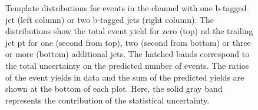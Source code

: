 \begin{figure}[htbp!]
\begin{center}
\caption{Template distributions for events in the \mumu channel with one b-tagged jet (left column) or two b-tagged jets (right column). The distributions show the total event yield for zero (top) nd the trailing jet pt for one (second from top),
  two (second from bottom) or three or more (bottom) additional jets. 
  The hatched bands correspond to the total uncertainty on the predicted number of events. The ratios of the event yields in data and the sum of the
  predicted yields are shown at the bottom of each plot. Here, the solid
  gray band represents the contribution of the statistical uncertainty.  
       \label{fig:xsec_mumu_inputdistr}}
  \end{center}
\end{figure}

